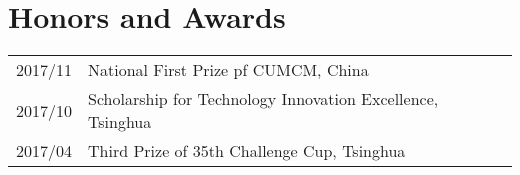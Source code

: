 \documentclass[a4paper,10pt]{article}
\begin{document}
\section{Honors and Awards}
\begin{tabular}{rl}
\textsc{2017/11} & National First Prize pf CUMCM, China                       \\
\textsc{2017/10} & Scholarship for Technology Innovation Excellence, Tsinghua \\
\textsc{2017/04} & Third Prize of 35th Challenge Cup, Tsinghua                \\
\end{tabular}
\end{document}
